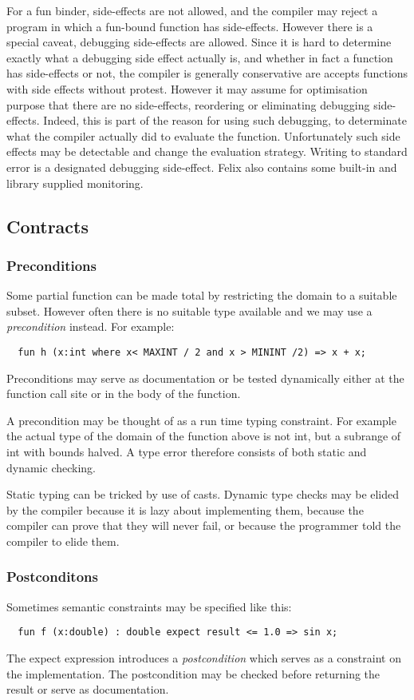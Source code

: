 \documentclass{article}
\begin{document}
For a fun binder, side-effects are not allowed, and the
compiler may reject a program in which a fun-bound
function has side-effects. However there is a special
caveat, debugging side-effects are allowed. Since it
is hard to determine exactly what a debugging side effect
actually is, and whether in fact a function has side-effects
or not, the compiler is generally conservative are accepts
functions with side effects without protest. However it
may assume for optimisation purpose that there are no 
side-effects, reordering or eliminating debugging side-effects.
Indeed, this is part of the reason for using such debugging,
to determinate what the compiler actually did to evaluate
the function. Unfortunately such side effects may be detectable
and change the evaluation strategy. Writing to standard error
is a designated debugging side-effect. Felix also contains some
built-in and library supplied monitoring.

\subsection{Contracts}
\subsubsection{Preconditions}
Some partial function can be made total by restricting the
domain to a suitable subset. However often there is no suitable
type available and we may use a {\em precondition} instead.
For example:
\begin{verbatim}
  fun h (x:int where x< MAXINT / 2 and x > MININT /2) => x + x;
\end{verbatim} 
Preconditions may serve as documentation or be tested
dynamically either at the function call site or in the body
of the function.

A precondition may be thought of as a run time typing
constraint. For example the actual type of the domain
of the function above is not int, but a subrange of
int with bounds halved. A type error therefore
consists of both static and dynamic checking.

Static typing can be tricked by use of casts.
Dynamic type checks may be elided by the compiler because
it is lazy about implementing them, because the compiler
can prove that they will never fail, or because the programmer
told the compiler to elide them.

\subsubsection{Postconditons}
Sometimes semantic constraints may be specified like this:
\begin{verbatim}
  fun f (x:double) : double expect result <= 1.0 => sin x;
\end{verbatim}
The expect expression introduces a {\em postcondition}
which serves as a constraint on the implementation.
The postcondition may be checked before returning the
result or serve as documentation.
\end{document}
